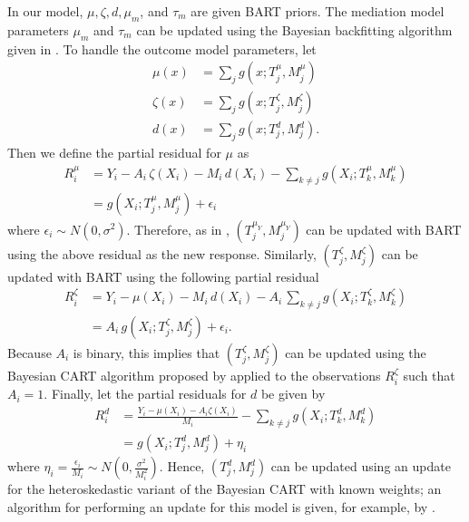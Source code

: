 \documentclass[12pt]{article}
\theoremstyle{remark}
\theoremstyle{definition}
\begin{document}
In our model, $\mu, \zeta, d, \mu_m$, and $\tau_m$ are given BART priors. The mediation model parameters $\mu_m$ and $\tau_m$ can be updated using the Bayesian backfitting algorithm given in \citet{hahn2020bayesian}. To handle the outcome model parameters, let
\begin{align*}
    \mu(x) &= \sum_j g(x; T_j^{\mu}, M_j^{\mu}) \\
    \zeta(x) &= \sum_j g(x; T_j^{\zeta}, M_j^{\zeta}) \\
    d(x) &= \sum_j g(x; T_j^{d}, M_j^{d}).
\end{align*}
Then we define the partial residual for $\mu$ as
\begin{align*}
    R_{i}^{\mu} &= Y_i - A_i \, \zeta(X_i) - M_i \, d(X_i) - \sum_{k \neq j} g(X_i; T_k^{\mu}, M_k^{\mu}) \\
    &=  g(X_i; T_j^{\mu}, M_j^{\mu}) + \epsilon_i
\end{align*}
where $\epsilon_i\sim N(0, \sigma^2)$. Therefore, as in \citet{chipman1998bayesian}, $(T_j^{\mu_Y}, M_j^{\mu_Y})$ can be updated with BART using the above residual as the new response. Similarly, $(T_j^{\zeta}, M_j^{\zeta})$ can be updated with BART using the following partial residual
\begin{align*}
  R_i^\zeta
  &= Y_i - \mu(X_i) - M_i \, d(X_i)
    - A_i \, \sum_{k \ne j} g(X_i; T_k^\zeta, M_k^\zeta) \\
  &= A_i \, g(X_i ; T_j^\zeta, M_j^\zeta) + \epsilon_i.
\end{align*}
Because $A_i$ is binary, this implies that $(T_j^\zeta, M_j^\zeta)$ can be updated using the Bayesian CART algorithm proposed by \citet{chipman1998bayesian} applied to the observations $R_i^\zeta$ such that $A_i = 1$. Finally, let the partial residuals for $d$ be given by
\begin{align*}
  R_i^{d} &= \frac{Y_i - \mu(X_i) - A_i\zeta(X_i)}{M_i}
            - \sum_{k \neq j} g(X_i; T_k^{d}, M_k^{d}) \\
    &= g(X_i; T_j^d, M_j^d) + \eta_i
\end{align*}
where $\eta_i = \frac{\epsilon_i}{M_i} \sim N\left( 0, \frac{\sigma^2}{M_i^2} \right)$. Hence, $(T_j^d, M_j^d)$ can be updated using an update for the heteroskedastic variant of the Bayesian CART with known weights; an algorithm for performing an update for this model is given, for example, by \citet{pratola2020heteroscedastic}.
\end{document}
